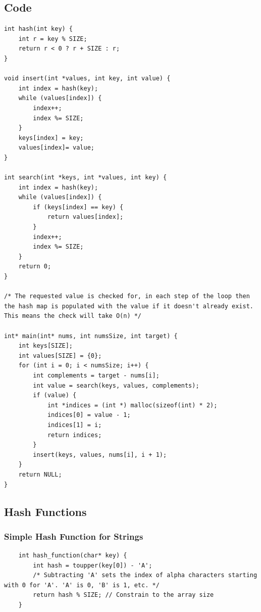 \documentclass[11pt]{article}
\begin{document}
\subsection{Code}
\begin{lstlisting}
int hash(int key) {
    int r = key % SIZE;
    return r < 0 ? r + SIZE : r;
}

void insert(int *values, int key, int value) {
    int index = hash(key);
    while (values[index]) {
        index++;
        index %= SIZE;
    }
    keys[index] = key;
    values[index]= value;
}

int search(int *keys, int *values, int key) {
    int index = hash(key);
    while (values[index]) {
        if (keys[index] == key) {
            return values[index];
        }
        index++;
        index %= SIZE;
    }
    return 0;
}

/* The requested value is checked for, in each step of the loop then the hash map is populated with the value if it doesn't already exist. This means the check will take O(n) */

int* main(int* nums, int numsSize, int target) {
    int keys[SIZE];
    int values[SIZE] = {0};
    for (int i = 0; i < numsSize; i++) {
        int complements = target - nums[i];
        int value = search(keys, values, complements);
        if (value) {
            int *indices = (int *) malloc(sizeof(int) * 2);
            indices[0] = value - 1;
            indices[1] = i;
            return indices;
        }
        insert(keys, values, nums[i], i + 1);
    }
    return NULL;
}
\end{lstlisting}

\subsection{Hash Functions}

\begin{table}
    
\end{table}

\subsubsection{Simple Hash Function for Strings}
\begin{lstlisting}
    int hash_function(char* key) {
        int hash = toupper(key[0]) - 'A'; 
        /* Subtracting 'A' sets the index of alpha characters starting with 0 for 'A'. 'A' is 0, 'B' is 1, etc. */
        return hash % SIZE; // Constrain to the array size
    }
\end{lstlisting}
\end{document}
